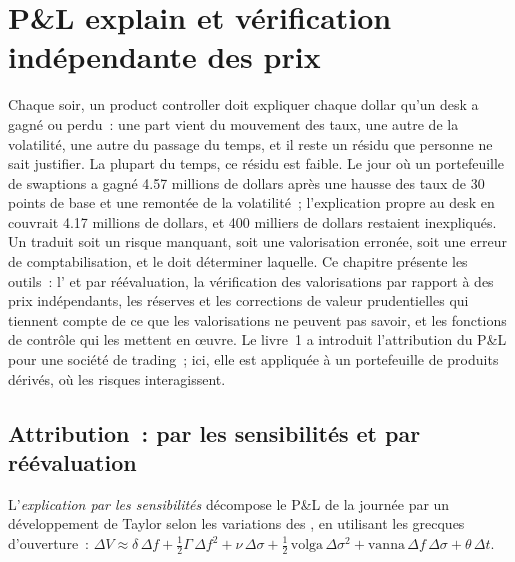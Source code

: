 \chapter{P\&L explain et vérification indépendante des prix}\label{ch:rc:pnl-explain-and-independent-price-verification}

Chaque soir, un product controller doit expliquer chaque dollar qu'un desk a gagné ou perdu~: une part
vient du mouvement des taux, une autre de la volatilité, une autre du passage du temps, et il reste un
résidu que personne ne sait justifier. La plupart du temps, ce résidu est faible. Le jour où un portefeuille de swaptions a gagné
4.57 millions de dollars après une hausse des taux de 30 points de base et une remontée de la volatilité~;
l'explication propre au desk en couvrait 4.17 millions de dollars, et 400 milliers de dollars restaient inexpliqués. Un
 traduit soit un risque manquant, soit une valorisation erronée, soit une erreur de comptabilisation, et le 
doit déterminer laquelle. Ce chapitre présente les outils~: l' et par réévaluation,
la vérification des valorisations par rapport à des prix indépendants, les réserves et les
corrections de valeur prudentielles qui tiennent compte de ce que les valorisations ne peuvent pas savoir, et les fonctions de contrôle
qui les mettent en œuvre. Le livre~1 a introduit l'attribution du P\&L pour une société de trading~;
ici, elle est appliquée à un portefeuille de produits dérivés, où les risques interagissent.

\section{Attribution~: par les sensibilités et par réévaluation}

\begin{definition}\label{def:rc:pnl-explain-and-independent-price-verification:risk}
L'\emph{explication par les sensibilités} décompose le P\&L de la
journée par un développement de Taylor selon les variations des , en utilisant les grecques d'ouverture~:
$\Delta V\approx\delta\,\Delta f+\tfrac12\Gamma\,\Delta f^2+\nu\,\Delta\sigma+\tfrac12\,\mathrm{volga}\,\Delta\sigma^2+\mathrm{vanna}\,\Delta f\,\Delta\sigma+\theta\,\Delta t$.
\end{definition}

